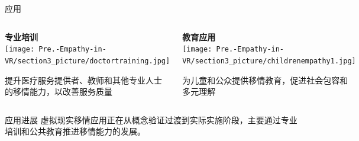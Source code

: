 \documentclass[aspectratio=169,xcolor=dvipsnames]{beamer}
\begin{document}
\begin{frame}{应用}
    \begin{columns}[c]    
        \begin{center}
            \textbf{\large 专业培训} \\
            \vspace{0.1cm}
            \texttt{[image: Pre.-Empathy-in-VR/section3\_picture/doctortraining.jpg]} \\
            \vspace{0.1cm}
            \begin{minipage}{0.95\textwidth}
                \centering\small
                提升医疗服务提供者、教师和其他专业人士的移情能力，以改善服务质量
            \end{minipage}
        \end{center}
        
        \begin{center}
            \textbf{\large 教育应用} \\
            \vspace{0.1cm}
            \texttt{[image: Pre.-Empathy-in-VR/section3\_picture/childrenempathy1.jpg]} \\
            \vspace{0.1cm}
            \begin{minipage}{0.95\textwidth}
                \centering\small
                为儿童和公众提供移情教育，促进社会包容和多元理解
            \end{minipage}
        \end{center}
    \end{columns}
    
    \begin{block}{应用进展}
        虚拟现实移情应用正在从概念验证过渡到实际实施阶段，主要通过专业培训和公共教育推进移情能力的发展。
\end{block}
\end{frame}
\end{document}
